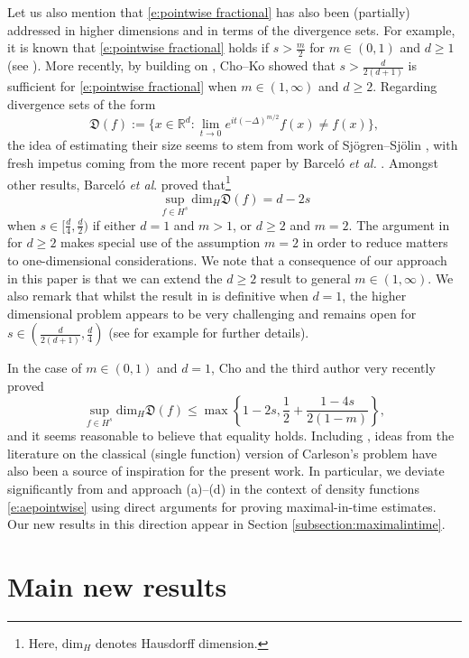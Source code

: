 \documentclass[a4paper]{amsart}
\numberwithin{equation}{section}%
\theoremstyle{plain}%
\theoremstyle{definition}
\theoremstyle{remark}%
\def\dim{\mathrm{dim}}
\begin{document}
Let us also mention that \eqref{e:pointwise fractional} has also been (partially) addressed in higher dimensions and in terms of the divergence sets. For example, it is known that \eqref{e:pointwise fractional} holds if $s > \frac m2$ for $m \in (0,1)$ and $d \geq 1$ (see \cite{Cowling, Wl97}). More recently, by building on \cite{DuGuthLi, DuZhang}, Cho--Ko \cite{CK18} showed that $s>\frac{d}{2(d+1)}$ is sufficient for \eqref{e:pointwise fractional} when $m \in (1,\infty)$ and $d \geq 2$. Regarding divergence sets of the form
\[
\mathfrak{D}(f) := \{ x \in \mathbb{R}^d : \lim_{t \to 0} e^{it(-\Delta)^{m/2}}f(x) \neq f(x)\},
\]
the idea of estimating their size seems to stem from work of Sj\"{o}gren--Sj\"{o}lin \cite{SS89}, with fresh impetus coming from the more recent paper by Barcel\'o \textit{et al.} \cite{BBCR}. Amongst other results, Barcel\'o \emph{et al}. proved that\footnote{Here, $\dim_H$ denotes Hausdorff dimension.} 
\[
\sup_{f\in H^s}\dim_H
\mathfrak{D}(f)
=
d-2s
\]
when $s\in[\frac{d}{4},\frac{d}{2})$ if either $d = 1$ and $m > 1$, or $d \geq 2$ and $m = 2$. The argument in \cite[Proposition 3.1]{BBCR} for $d \geq 2$ makes special use of the assumption $m = 2$ in order to reduce matters to one-dimensional considerations. We note that a consequence of our approach in this paper is that we can extend the $d \geq 2$ result to general $m \in (1,\infty)$. We also remark that whilst the result in \cite{BBCR} is  definitive when $d = 1$, the higher dimensional problem appears to be very challenging and remains open for $s \in (\frac{d}{2(d + 1)},\frac{d}{4})$ (see for example \cite{DuZhang, EP22, LR19a,LR19b} for further details).

In the case of $m\in(0,1)$ and $d = 1$, Cho and the third author \cite{CS22} very recently proved
\[
\sup_{f\in H^s}\dim_H
\mathfrak{D}(f)
\leq
\max\left\{
1-2s,
\frac12+\frac{1-4s}{2(1-m)}
\right\},
\]
and it seems reasonable to believe that equality holds. Including \cite{CS22}, ideas from the literature on the classical (single function) version of Carleson's problem have also been a source of inspiration for the present work. In particular, we deviate significantly from \cite{BLN_Selecta} and approach (a)--(d) in the context of density functions \eqref{e:aepointwise} using direct arguments for proving maximal-in-time estimates. Our new results in this direction appear in Section \ref{subsection:maximalintime}.


\section{Main new results} \label{section:mainresults}
\end{document}
